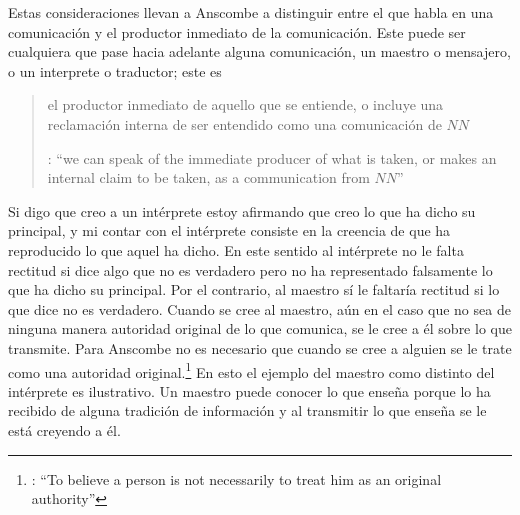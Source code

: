 Estas consideraciones llevan a Anscombe a distinguir entre el que habla en una comunicación y el productor inmediato de la comunicación. Este puede ser cualquiera que pase hacia adelante alguna comunicación, un maestro o mensajero, o un interprete o traductor; este es \blockquote[{\cite[8]{anscombe2008faith:tobelieve}}: \enquote{we can speak of the immediate producer of what is taken, or makes an internal claim to be taken, as a communication from $NN$}]{el productor inmediato de aquello que se entiende, o incluye una reclamación interna de ser entendido como una comunicación de $NN$}. Si digo que creo a un intérprete estoy afirmando que creo lo que ha dicho su principal, y mi contar con el intérprete consiste en la creencia de que ha reproducido lo que aquel ha dicho. En este sentido al intérprete no le falta rectitud si dice algo que no es verdadero pero no ha representado falsamente lo que ha dicho su principal. Por el contrario, al maestro sí le faltaría rectitud si lo que dice no es verdadero. Cuando se cree al maestro, aún en el caso que no sea de ninguna manera autoridad original de lo que comunica, se le cree a él sobre lo que transmite. Para Anscombe no es necesario que cuando se cree a alguien se le trate como una autoridad original.\footnote{\cite[Cf.~][5]{anscombe2008faith:tobelieve}: \enquote{To believe a person is not necessarily to treat him as an original authority}} En esto el ejemplo del maestro como distinto del intérprete es ilustrativo. Un maestro puede conocer lo que enseña porque lo ha recibido de alguna tradición de información y al transmitir lo que enseña se le está creyendo a él.

